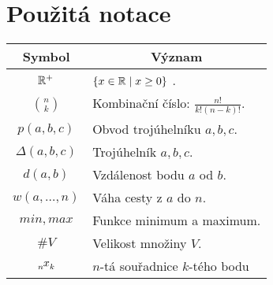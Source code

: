 \chapter*{Použitá notace}
\label{sec:notace}
\noindent
\begin{table}[h]
    \centering
\begin{tabular}{c l}
    Symbol & \multicolumn{1}{c}{Význam} \\
    \toprule
    $\mathbb{R}^+$ & $\{ x \in \mathbb{R} \mid x \geq 0 \}$ .\\
    $ \binom{n}{k}$ & Kombinační číslo: $\frac{n!}{k!(n-k)!}$. \\
    $ p(a, b, c)$ & Obvod trojúhelníku $a, b, c$. \\
    $\Delta(a,b,c)$ & Trojúhelník $a, b, c$.\\
    $ d(a, b)$ & Vzdálenost bodu $a$ od $b$. \\
    $ w(a, \ldots, n)$ & Váha cesty z $a$ do $n$. \\
    $min, max$ & Funkce minimum a maximum. \\
    $ \#V $& Velikost množiny $V$. \\
    $\x{n}{k}$ & $n$-tá souřadnice $k$-tého bodu
\end{tabular}
\end{table}